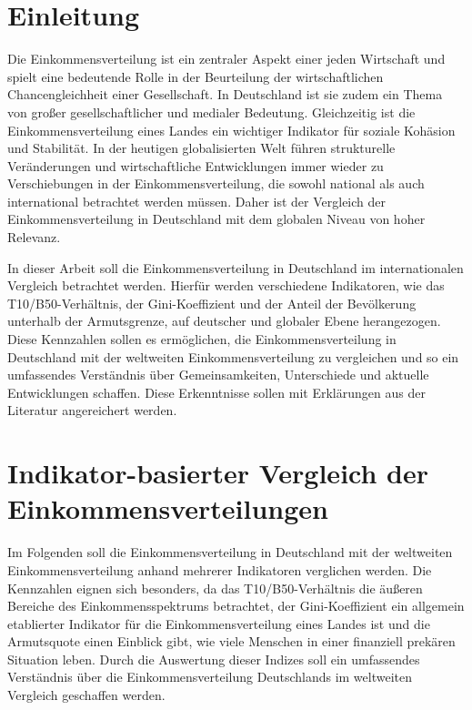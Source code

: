\chapter{Einleitung}

Die Einkommensverteilung ist ein zentraler Aspekt einer jeden Wirtschaft und spielt eine bedeutende Rolle in der Beurteilung der wirtschaftlichen Chancengleichheit einer Gesellschaft. In Deutschland ist sie zudem ein Thema von gro{\ss}er gesellschaftlicher und medialer Bedeutung. Gleichzeitig ist die Einkommensverteilung eines Landes ein wichtiger Indikator für soziale Kohäsion und Stabilität. In der heutigen globalisierten Welt führen strukturelle Veränderungen und wirtschaftliche Entwicklungen immer wieder zu Verschiebungen in der Einkommensverteilung, die sowohl national als auch international betrachtet werden müssen. Daher ist der Vergleich der Einkommensverteilung in Deutschland mit dem globalen Niveau von hoher Relevanz.

In dieser Arbeit soll die Einkommensverteilung in Deutschland im internationalen Vergleich betrachtet werden. Hierfür werden verschiedene Indikatoren, wie das T10/B50-Verhältnis, der Gini-Koeffizient und der Anteil der Bevölkerung unterhalb der Armutsgrenze, auf deutscher und globaler Ebene herangezogen. Diese Kennzahlen sollen es ermöglichen, die Einkommensverteilung in Deutschland mit der weltweiten Einkommensverteilung zu vergleichen und so ein umfassendes Verständnis über Gemeinsamkeiten, Unterschiede und aktuelle Entwicklungen schaffen. Diese Erkenntnisse sollen mit Erklärungen aus der Literatur angereichert werden.

\chapter{Indikator-basierter Vergleich der Einkommensverteilungen}

Im Folgenden soll die Einkommensverteilung in Deutschland mit der weltweiten Einkommensverteilung anhand mehrerer Indikatoren verglichen werden. Die Kennzahlen eignen sich besonders, da das T10/B50-Verhältnis die äu{\ss}eren Bereiche des Einkommensspektrums betrachtet, der Gini-Koeffizient ein allgemein etablierter Indikator für die Einkommensverteilung eines Landes ist und die Armutsquote einen Einblick gibt, wie viele Menschen in einer finanziell prekären Situation leben. Durch die Auswertung dieser Indizes soll ein umfassendes Verständnis über die Einkommensverteilung Deutschlands im weltweiten Vergleich geschaffen werden.

